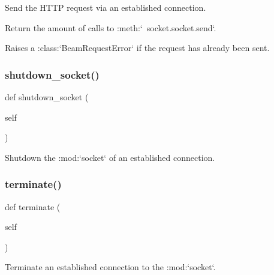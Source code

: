 \begin{DoxyVerb}Send the HTTP request via an established connection.

Return the amount of calls to :meth:`~socket.socket.send`.

Raises a :class:`BeamRequestError` if the request has already
been sent.
\end{DoxyVerb}
 \mbox{\label{classpewpewlaz0rt4nk_1_1_beam_a00fe8c4d6cb42ed708b01611e4bc70dd}} 
\subsubsection{\texorpdfstring{shutdown\+\_\+socket()}{shutdown\_socket()}}
{\footnotesize\ttfamily def shutdown\+\_\+socket (\begin{DoxyParamCaption}\item[{}]{self }\end{DoxyParamCaption})}

\begin{DoxyVerb}Shutdown the :mod:`socket` of an established connection.\end{DoxyVerb}
 \mbox{\label{classpewpewlaz0rt4nk_1_1_beam_a2561ec6ff5ec151676f3e0206e635bb8}} 
\subsubsection{\texorpdfstring{terminate()}{terminate()}}
{\footnotesize\ttfamily def terminate (\begin{DoxyParamCaption}\item[{}]{self }\end{DoxyParamCaption})}

\begin{DoxyVerb}Terminate an established connection to the :mod:`socket`.\end{DoxyVerb}
 \mbox{\label{classpewpewlaz0rt4nk_1_1_beam_a7e676bc8e672824cf0719bff524d4067}} 
